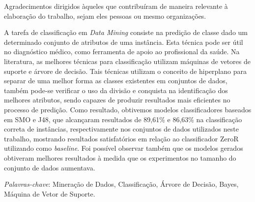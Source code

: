 \documentclass[
	12pt,				%
	openright,			%
	oneside,	
	a4paper,				%
	english,				%
	brazil				%
]{abntex2/abntex2} %
\begin{document}
\begin{agradecimentos}

Agradecimentos dirigidos àqueles que contribuíram de maneira relevante à elaboração do trabalho, sejam eles pessoas ou mesmo organizações.

\end{agradecimentos}







\setlength{\absparsep}{18pt} %
\begin{resumo}

 	A tarefa de classificação em \textit{Data Mining} consiste na predição de classe dado um determinado conjunto de atributos de uma instância. Esta técnica pode ser útil no diagnóstico médico, como ferramenta de apoio ao profissional da saúde. Na literatura, as melhores técnicas para classificação utilizam máquinas de vetores de suporte e árvore de decisão. Tais técnicas utilizam o conceito de hiperplano para separar de uma melhor forma as classes existentes em conjuntos de dados, também pode-se verificar o uso da divisão e conquista na identificação dos melhores atributos, sendo capazes de produzir resultados mais eficientes no processo de predição. Como resultado, obtivemos modelos classificadores baseados em SMO e J48, que alcançaram resultados de 89,61\% e 86,63\% na classificação correta de instâncias, respectivamente nos conjuntos de dados utilizados neste trabalho, mostrando resultados satisfatórios em relação ao classificador ZeroR utilizando como \textit{baseline}. Foi possível observar também que os modelos gerados obtiveram melhores resultados à medida que os experimentos no tamanho do conjunto de dados aumentava.

 \textit{Palavras-chave}: Mineração de Dados, Classificação, Árvore de Decisão, Bayes, Máquina de Vetor de Suporte.

\end{resumo}
\end{document}

